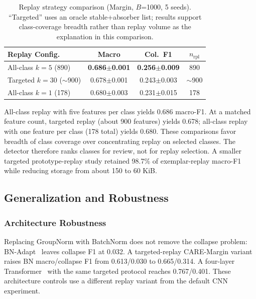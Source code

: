 \documentclass[journal]{IEEEtran}
\begin{document}
\begin{table}[!htbp]
\centering
\caption{Replay strategy comparison (Margin, $B$=1000, 5 seeds). ``Targeted'' uses an oracle stable+absorber list; results support class-coverage breadth rather than replay volume as the explanation in this comparison.}
\label{tab:replay_ablation}
\scriptsize
\setlength{\tabcolsep}{3pt}
\begin{tabular}{@{}l cc c@{}}
\toprule
Replay Config. & Macro & Col.\ F1 & $n_{\text{rpl}}$ \\
\midrule
All-class $k{=}5$ (890) & \textbf{0.686$\pm$0.001} & \textbf{0.256$\pm$0.009} & 890 \\
Targeted $k{=}30$ (${\sim}$900) & 0.678$\pm$0.001 & 0.243$\pm$0.003 & $\sim$900 \\
All-class $k{=}1$ (178) & 0.680$\pm$0.003 & 0.231$\pm$0.015 & 178 \\
\bottomrule
\end{tabular}
\end{table}

All-class replay with five features per class yields 0.686 macro-F1. At a matched feature count, targeted replay (about 900 features) yields 0.678; all-class replay with one feature per class (178 total) yields 0.680. These comparisons favor breadth of class coverage over concentrating replay on selected classes. The detector therefore ranks classes for review, not for replay selection. A smaller targeted prototype-replay study retained 98.7\% of exemplar-replay macro-F1 while reducing storage from about 150 to 60 KiB.

\subsection{Generalization and Robustness}
\label{sec:generalization_robustness}


\subsubsection{Architecture Robustness}
\label{sec:robustness}
\label{sec:bn_verify}
\label{sec:transformer}
Replacing GroupNorm with BatchNorm does not remove the collapse problem: BN-Adapt~\cite{schneider2020bn} leaves collapse F1 at 0.032. A targeted-replay CARE-Margin variant raises BN macro/collapse F1 from 0.613/0.030 to 0.665/0.314. A four-layer Transformer~\cite{vaswani2017attention} with the same targeted protocol reaches 0.767/0.401. These architecture controls use a different replay variant from the default CNN experiment.
\end{document}
